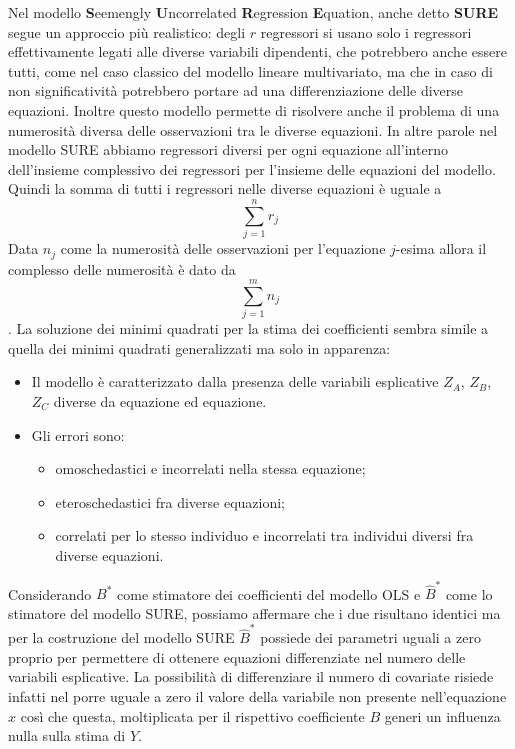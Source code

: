 \documentclass[a4page, 11pt]{article} %
\begin{document}
Nel modello \textbf{S}eemengly \textbf{U}ncorrelated \textbf{R}egression \textbf{E}quation, anche detto \textbf{SURE} segue un approccio più realistico: degli $r$ regressori si usano solo i regressori effettivamente legati alle diverse variabili dipendenti, che potrebbero anche essere tutti, come nel caso classico del modello lineare multivariato, ma che in caso di non significatività potrebbero portare ad una differenziazione delle diverse equazioni. Inoltre questo modello permette di risolvere anche il problema di una numerosità diversa delle osservazioni tra le diverse equazioni.
\newline
In altre parole nel modello SURE abbiamo regressori diversi per ogni equazione all’interno dell’insieme complessivo dei regressori per l’insieme delle equazioni del modello. 
\newline
Quindi la somma di tutti i regressori nelle diverse equazioni è uguale a
\begin{equation*}
\sum_{j=1}^n r_j
\end{equation*}
\newline
Data $n_j$ come la numerosità delle osservazioni per l’equazione $j$-esima allora il complesso delle numerosità è dato da 
\begin{equation*}
\sum_{j=1}^m n_j
\end{equation*}.
\newline
La soluzione dei minimi quadrati per la stima dei coefficienti sembra simile a quella dei minimi quadrati generalizzati ma solo in apparenza: 
\begin{itemize}
\item Il modello è caratterizzato dalla presenza delle variabili esplicative $Z_A$, $Z_B$, $Z_C$ diverse da equazione ed equazione.
\item Gli errori sono:
	\begin{itemize}[noitemsep]
	\item omoschedastici e incorrelati nella stessa equazione;
	\item eteroschedastici fra diverse equazioni;
	\item correlati per lo stesso individuo e incorrelati tra individui diversi fra diverse equazioni.
	\end{itemize}
\end{itemize}
Considerando $B^*$ come stimatore dei coefficienti del modello OLS e $\hat{B}^*$ come lo stimatore del modello SURE, possiamo affermare che i due risultano identici ma per la costruzione del modello SURE $\hat{B}^*$ possiede dei parametri uguali a zero proprio per permettere di ottenere equazioni differenziate nel numero delle variabili esplicative. La possibilità di differenziare il numero di covariate risiede infatti nel porre uguale a zero il valore della variabile non presente nell'equazione $x$ così che questa, moltiplicata per il rispettivo coefficiente $B$ generi un influenza nulla sulla stima di $Y$. 
\end{document}

